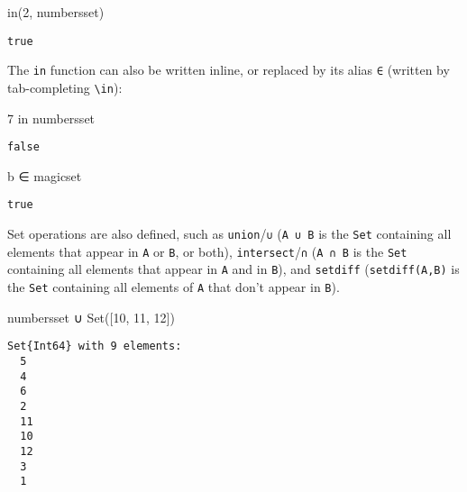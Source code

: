\documentclass[
  letterpaper,
  DIV=11,
  numbers=noendperiod]{scrreprt}
\newenvironment{Shaded}{\begin{snugshade}}{\end{snugshade}}
\newcommand{\CharTok}[1]{\textcolor[rgb]{0.13,0.47,0.30}{#1}}
\newcommand{\FloatTok}[1]{\textcolor[rgb]{0.68,0.00,0.00}{#1}}
\newcommand{\FunctionTok}[1]{\textcolor[rgb]{0.28,0.35,0.67}{#1}}
\newcommand{\KeywordTok}[1]{\textcolor[rgb]{0.00,0.23,0.31}{#1}}
\newcommand{\NormalTok}[1]{\textcolor[rgb]{0.00,0.23,0.31}{#1}}
\newcommand{\OperatorTok}[1]{\textcolor[rgb]{0.37,0.37,0.37}{#1}}
\begin{document}
\begin{Shaded}
\begin{Highlighting}[]
\FunctionTok{in}\NormalTok{(}\FloatTok{2}\NormalTok{, numbersset)}
\end{Highlighting}
\end{Shaded}

\begin{verbatim}
true
\end{verbatim}

The \texttt{in} function can also be written inline, or replaced by its
alias \texttt{∈} (written by tab-completing
\texttt{\textbackslash{}in}):

\begin{Shaded}
\begin{Highlighting}[]
\FloatTok{7} \KeywordTok{in}\NormalTok{ numbersset}
\end{Highlighting}
\end{Shaded}

\begin{verbatim}
false
\end{verbatim}

\begin{Shaded}
\begin{Highlighting}[]
\CharTok{\textquotesingle{}b\textquotesingle{}} \OperatorTok{∈}\NormalTok{ magicset}
\end{Highlighting}
\end{Shaded}

\begin{verbatim}
true
\end{verbatim}

Set operations are also defined, such as \texttt{union}/\texttt{∪}
(\texttt{A\ ∪\ B} is the \texttt{Set} containing all elements that
appear in \texttt{A} or \texttt{B}, or both),
\texttt{intersect}/\texttt{∩} (\texttt{A\ ∩\ B} is the \texttt{Set}
containing all elements that appear in \texttt{A} and in \texttt{B}),
and \texttt{setdiff} (\texttt{setdiff(A,B)} is the \texttt{Set}
containing all elements of \texttt{A} that don't appear in \texttt{B}).

\begin{Shaded}
\begin{Highlighting}[]
\NormalTok{numbersset }\OperatorTok{∪} \FunctionTok{Set}\NormalTok{([}\FloatTok{10}\NormalTok{, }\FloatTok{11}\NormalTok{, }\FloatTok{12}\NormalTok{])}
\end{Highlighting}
\end{Shaded}

\begin{verbatim}
Set{Int64} with 9 elements:
  5
  4
  6
  2
  11
  10
  12
  3
  1
\end{verbatim}
\end{document}
